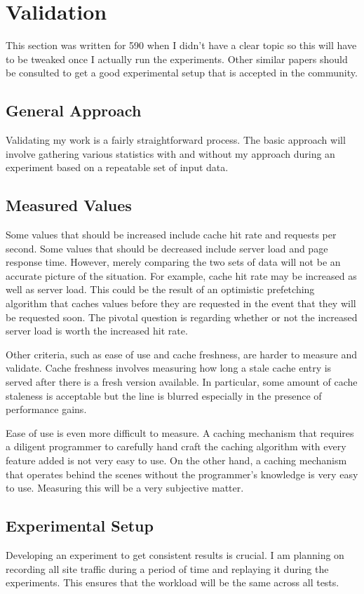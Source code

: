 \documentclass[12pt]{ucthesis}
\begin{document}
\chapter{Validation}
\label{validation}
This section was written for 590 when I didn't have a clear topic so this will have to be tweaked once I actually run the experiments.
Other similar papers should be consulted to get a good experimental setup that is accepted in the community.

\section{General Approach}
Validating my work is a fairly straightforward process.
The basic approach will involve gathering various statistics with and without my approach during an experiment based on a repeatable set of input data. %

\section{Measured Values}
Some values that should be increased include cache hit rate and requests per second.
Some values that should be decreased include server load and page response time.
However, merely comparing the two sets of data will not be an accurate picture of the situation.
For example, cache hit rate may be increased as well as server load.
This could be the result of an optimistic prefetching algorithm that caches values before they are requested in the event that they will be requested soon.
The pivotal question is regarding whether or not the increased server load is worth the increased hit rate.

Other criteria, such as ease of use and cache freshness, are harder to measure and validate.
Cache freshness involves measuring how long a stale cache entry is served after there is a fresh version available.
In particular, some amount of cache staleness is acceptable but the line is blurred especially in the presence of performance gains.

Ease of use is even more difficult to measure.
A caching mechanism that requires a diligent programmer to carefully hand craft the caching algorithm with every feature added is not very easy to use.
On the other hand, a caching mechanism that operates behind the scenes without the programmer's knowledge is very easy to use.
Measuring this will be a very subjective matter.

\section{Experimental Setup}
Developing an experiment to get consistent results is crucial.
I am planning on recording all site traffic during a period of time and replaying it during the experiments.
This ensures that the workload will be the same across all tests.
\end{document}

